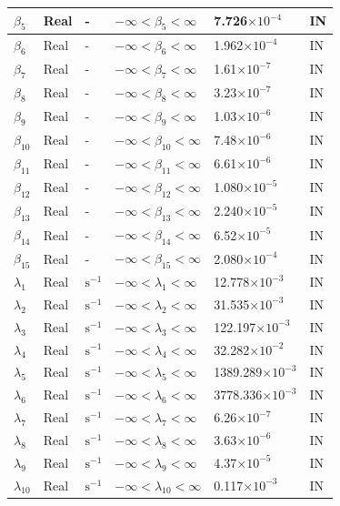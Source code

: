 \begin{longtable}{| p{\colCwidth} | p{\colCwidth} | p{\colDwidth}| p{\colAwidth}|
    p{\colFwidth}|p{\colCwidth}|}
\hline
$\beta_5$&Real&-&$-\infty < \beta_5 <\infty$&7.726$\times 10^{-4}$&IN\\
\hline
$\beta_6$&Real&-&$-\infty < \beta_6 <\infty$&1.962$\times 10^{-4}$&IN\\
\hline
$\beta_7$&Real&-&$-\infty < \beta_7 <\infty$&1.61$\times 10^{-7}$&IN\\
\hline
$\beta_8$&Real&-&$-\infty < \beta_8 <\infty$&3.23$\times 10^{-7}$&IN\\
\hline
$\beta_9$&Real&-&$-\infty < \beta_9<\infty$&1.03$\times 10^{-6}$&IN\\
\hline
$\beta_{10}$&Real&-&$-\infty < \beta_{10}<\infty$&7.48$\times 10^{-6}$&IN\\
\hline
$\beta_{11}$&Real&-&$-\infty < \beta_{11}<\infty$&6.61$\times 10^{-6}$&IN\\
\hline
$\beta_{12}$&Real&-&$-\infty < \beta_{12}<\infty$&1.080$\times 10^{-5}$&IN\\
\hline
$\beta_{13}$&Real&-&$-\infty < \beta_{13}<\infty$&2.240$\times 10^{-5}$&IN\\
\hline
$\beta_{14}$&Real&-&$-\infty < \beta_{14}<\infty$&6.52$\times 10^{-5}$&IN\\
\hline
$\beta_{15}$&Real&-&$-\infty < \beta_{15}<\infty$&2.080$\times 10^{-4}$&IN\\
\hline
$\lambda_1$&Real&$\text{s}^{-1}$&$-\infty <\lambda_1 <\infty$&12.778$\times 10^{-3}$&IN\\
\hline
$\lambda_2$&Real&$\text{s}^{-1}$&$-\infty <\lambda_2 <\infty$&31.535$\times 10^{-3}$&IN\\
\hline
$\lambda_3$&Real&$\text{s}^{-1}$&$-\infty <\lambda_3 <\infty$&122.197$\times 10^{-3}$&IN\\
\hline
$\lambda_4$&Real&$\text{s}^{-1}$&$-\infty <\lambda_4 <\infty$&32.282$\times 10^{-2}$&IN\\
\hline
$\lambda_5$&Real&$\text{s}^{-1}$&$-\infty <\lambda_5 <\infty$&1389.289$\times 10^{-3}$&IN\\
\hline
$\lambda_6$&Real&$\text{s}^{-1}$&$-\infty <\lambda_6 <\infty$&3778.336$\times 10^{-3}$&IN\\
\hline
$\lambda_7$&Real&$\text{s}^{-1}$&$-\infty <\lambda_7 <\infty$&6.26$\times 10^{-7}$&IN\\
\hline
$\lambda_8$&Real&$\text{s}^{-1}$&$-\infty <\lambda_8 <\infty$&3.63$\times 10^{-6}$&IN\\
\hline
$\lambda_9$&Real&$\text{s}^{-1}$&$-\infty <\lambda_9 <\infty$&4.37$\times 10^{-5}$&IN\\
\hline
$\lambda_{10}$&Real&$\text{s}^{-1}$&$-\infty <\lambda_{10} <\infty$&0.117$\times 10^{-3}$&IN\\

\end{longtable}
